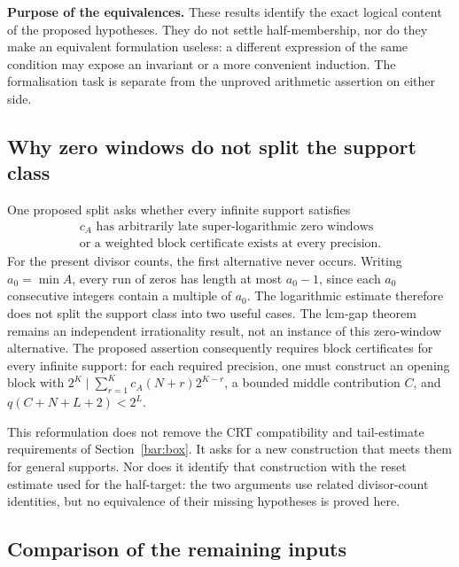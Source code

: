 \textbf{Purpose of the equivalences.} These results identify the exact
logical content of the proposed hypotheses.  They do not settle
half-membership, nor do they make an equivalent formulation useless: a
different expression of the same condition may expose an invariant or a
more convenient induction.  The formalisation task is separate from the
unproved arithmetic assertion on either side.

\subsection{Why zero windows do not split the support class}
\label{ssec:route-5}

One proposed split asks whether every infinite support satisfies
\[
 \begin{gathered}
 \text{$c_A$ has arbitrarily late super-logarithmic zero windows}\\
 \text{or a weighted block certificate exists at every precision.}
 \end{gathered}
\]
For the present divisor counts, the first alternative never occurs.
Writing $a_0=\min A$, every run of zeros has length at most $a_0-1$,
since each $a_0$ consecutive integers contain a multiple of $a_0$.
The logarithmic estimate
therefore does not split the support class into two useful cases.
The lcm-gap theorem
remains an independent irrationality result, not an instance of this
zero-window alternative.  The proposed assertion consequently requires
block certificates for every infinite support: for each required precision,
one must construct an opening block with
$2^K\mid\sum_{r=1}^Kc_A(N+r)2^{K-r}$, a bounded middle contribution $C$,
and $q(C+N+L+2)<2^L$.

This reformulation does not remove the CRT compatibility and tail-estimate
requirements of Section~\ref{bar:box}.  It asks for a new construction that
meets them for general supports.  Nor does it identify that construction
with the reset estimate used for the half-target: the two arguments use
related divisor-count identities, but no equivalence of their missing
hypotheses is proved here.

\subsection{Comparison of the remaining inputs}

